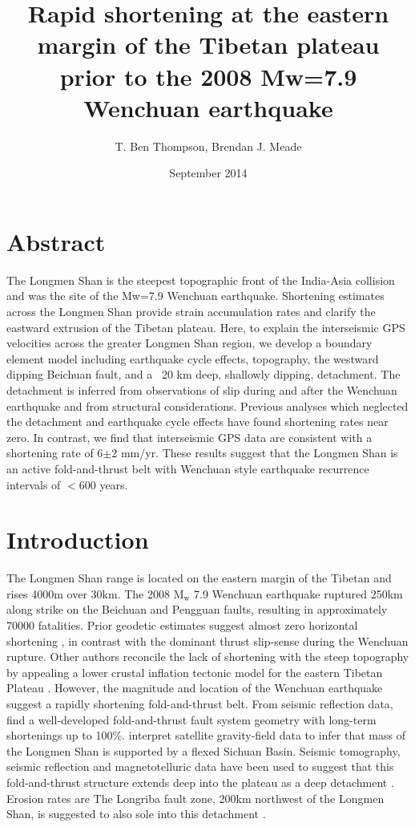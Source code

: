 \documentclass[12pt]{article}
\title{Rapid shortening at the eastern margin of the Tibetan plateau prior to the 2008 Mw=7.9 Wenchuan earthquake}
\author{T. Ben Thompson, Brendan J. Meade}
\date{September 2014}
\begin{document}
\maketitle

\section{Abstract}
The Longmen Shan is the steepest topographic front of the India-Asia collision and was the site of the Mw=7.9 Wenchuan earthquake. Shortening estimates across the Longmen Shan provide strain accumulation rates and clarify the eastward extrusion of the Tibetan plateau. Here, to explain the interseismic GPS velocities across the greater Longmen Shan region, we develop a boundary element model including earthquake cycle effects, topography, the westward dipping Beichuan fault, and a ~20 km deep, shallowly dipping, detachment. The detachment is inferred from observations of slip during and after the Wenchuan earthquake and from structural considerations. Previous analyses which neglected the detachment and earthquake cycle effects have found shortening rates near zero. In contrast, we find that interseismic GPS data are consistent with a shortening rate of 6$\pm$2 mm/yr. These results suggest that the Longmen Shan is an active fold-and-thrust belt with Wenchuan style earthquake recurrence intervals of $<$600 years.

\section{Introduction}
The Longmen Shan range is located on the eastern margin of the Tibetan and rises 4000m over 30km.  The 2008 $\mathrm{M_w}$ 7.9 Wenchuan earthquake ruptured 250km along strike on the Beichuan and Pengguan faults, resulting in approximately 70000 fatalities. Prior geodetic estimates suggest almost zero horizontal shortening \citep{king97, chen00, shen05, Meade07c, Loveless2011}, in contrast with the dominant thrust slip-sense during the Wenchuan rupture.  Other authors reconcile the lack of shortening with the steep topography by appealing a lower crustal inflation tectonic model for the eastern Tibetan Plateau \citep{royden97, bird91, Burchfiel2008a}.  However, the magnitude and location of the Wenchuan earthquake suggest a rapidly shortening fold-and-thrust belt. From seismic reflection data, \citet{hubbard09} find a well-developed fold-and-thrust fault system geometry with long-term shortenings up to 100\%. \citet{Fielding2012a} interpret satellite gravity-field data to infer that mass of the Longmen Shan is supported by a flexed Sichuan Basin. Seismic tomography, seismic reflection and magnetotelluric data have been used to suggest that this fold-and-thrust structure extends deep into the plateau as a deep detachment \citep{Zhang2009, Zhao2012, Guo2013}. Erosion rates are The Longriba fault zone, 200km northwest of the Longmen Shan, is suggested to also sole into this detachment \citep{Xu2008, Ren2013}.
\end{document}
